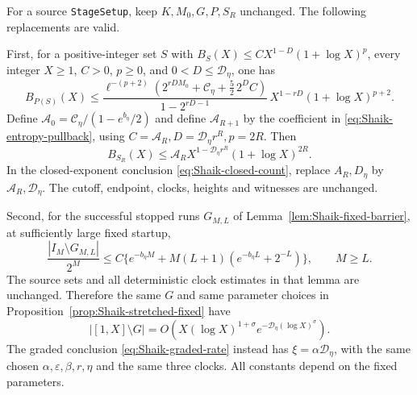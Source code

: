 \begin{corollary}
\label{cor:Shaik-entropy-propagation}
For a source \texttt{StageSetup}, keep \(K,M_0,G,P,S_R\) unchanged.
The following replacements are valid.

First, for a positive-integer set \(S\) with
\(B_S(X)\le C X^{1-D}(1+\log X)^p\), every integer \(X\ge1\),
\(C>0\), \(p\ge0\), and \(0<D\le\mathcal D_\eta\), one has
\begin{equation}\label{eq:Shaik-entropy-pullback}
 B_{P(S)}(X)\le
 \frac{\ell^{-(p+2)}
  (2^{rDM_0}+\mathcal C_\eta+\frac52\,2^D C)}
 {1-2^{rD-1}}\,
 X^{1-rD}(1+\log X)^{p+2}.
\end{equation}
Define \(\mathcal A_0=\mathcal C_\eta/(1-e^{b_\eta}/2)\) and define
\(\mathcal A_{R+1}\) by the coefficient in
\eqref{eq:Shaik-entropy-pullback}, using
\(C=\mathcal A_R,D=\mathcal D_\eta r^R,p=2R\).
Then
\begin{equation}\label{eq:Shaik-entropy-iterate}
 B_{S_R}(X)\le
 \mathcal A_R X^{1-\mathcal D_\eta r^R}(1+\log X)^{2R}.
\end{equation}
In the closed-exponent conclusion
\eqref{eq:Shaik-closed-count}, replace
\(A_R,D_\eta\) by \(\mathcal A_R,\mathcal D_\eta\).
The cutoff, endpoint, clocks, heights and witnesses are unchanged.

Second, for the successful stopped runs \(G_{M,L}\) of
Lemma~\ref{lem:Shaik-fixed-barrier}, at sufficiently large fixed startup,
\begin{equation}\label{eq:Shaik-entropy-fixed-failure}
 \frac{|I_M\setminus G_{M,L}|}{2^M}
 \le C\{e^{-b_\eta M}
       +M(L+1)(e^{-b_\eta L}+2^{-L})\},
 \qquad M\ge L.
\end{equation}
The source sets and all deterministic clock estimates in that lemma
are unchanged. Therefore the same \(G\) and same parameter choices
in Proposition~\ref{prop:Shaik-stretched-fixed} have
\begin{equation}\label{eq:Shaik-entropy-stretched}
 |[1,X]\setminus G|
 =O\!\left(X(\log X)^{1+\sigma}
      e^{-\mathcal D_\eta(\log X)^\sigma}\right).
\end{equation}
The graded conclusion \eqref{eq:Shaik-graded-rate} instead has
\(\xi=\alpha\mathcal D_\eta\), with the same chosen
\(\alpha,\varepsilon,\beta,r,\eta\) and the same three clocks.
All constants depend on the fixed parameters.
\end{corollary}
